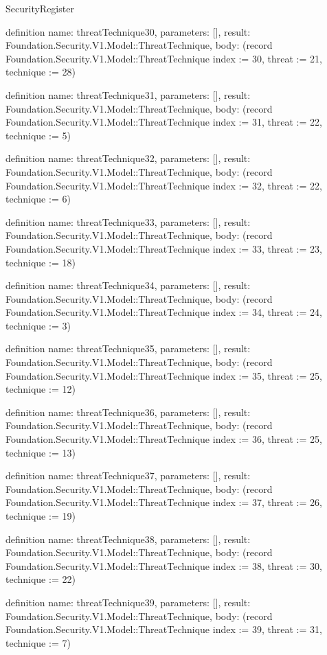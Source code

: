 \begin{lexlean}{SecurityRegister}
\begin{semanticmodule}
definition{
  name: threatTechnique30,
  parameters: [],
  result: Foundation.Security.V1.Model::ThreatTechnique,
  body: (record Foundation.Security.V1.Model::ThreatTechnique {index := 30, threat := 21, technique := 28})
}

definition{
  name: threatTechnique31,
  parameters: [],
  result: Foundation.Security.V1.Model::ThreatTechnique,
  body: (record Foundation.Security.V1.Model::ThreatTechnique {index := 31, threat := 22, technique := 5})
}

definition{
  name: threatTechnique32,
  parameters: [],
  result: Foundation.Security.V1.Model::ThreatTechnique,
  body: (record Foundation.Security.V1.Model::ThreatTechnique {index := 32, threat := 22, technique := 6})
}

definition{
  name: threatTechnique33,
  parameters: [],
  result: Foundation.Security.V1.Model::ThreatTechnique,
  body: (record Foundation.Security.V1.Model::ThreatTechnique {index := 33, threat := 23, technique := 18})
}

definition{
  name: threatTechnique34,
  parameters: [],
  result: Foundation.Security.V1.Model::ThreatTechnique,
  body: (record Foundation.Security.V1.Model::ThreatTechnique {index := 34, threat := 24, technique := 3})
}

definition{
  name: threatTechnique35,
  parameters: [],
  result: Foundation.Security.V1.Model::ThreatTechnique,
  body: (record Foundation.Security.V1.Model::ThreatTechnique {index := 35, threat := 25, technique := 12})
}

definition{
  name: threatTechnique36,
  parameters: [],
  result: Foundation.Security.V1.Model::ThreatTechnique,
  body: (record Foundation.Security.V1.Model::ThreatTechnique {index := 36, threat := 25, technique := 13})
}

definition{
  name: threatTechnique37,
  parameters: [],
  result: Foundation.Security.V1.Model::ThreatTechnique,
  body: (record Foundation.Security.V1.Model::ThreatTechnique {index := 37, threat := 26, technique := 19})
}

definition{
  name: threatTechnique38,
  parameters: [],
  result: Foundation.Security.V1.Model::ThreatTechnique,
  body: (record Foundation.Security.V1.Model::ThreatTechnique {index := 38, threat := 30, technique := 22})
}

definition{
  name: threatTechnique39,
  parameters: [],
  result: Foundation.Security.V1.Model::ThreatTechnique,
  body: (record Foundation.Security.V1.Model::ThreatTechnique {index := 39, threat := 31, technique := 7})
}


\end{semanticmodule}
\end{lexlean}
